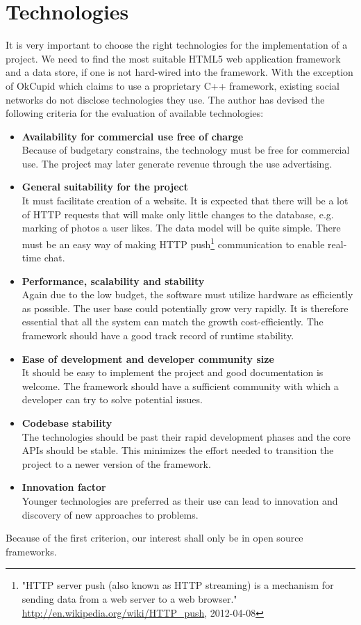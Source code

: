 \documentclass[12pt,oneside]{fithesis}
\begin{document}
\section{Technologies}
	It is very important to choose the right technologies for the implementation of a project. We need to find the most suitable HTML5 web application framework and a data store, if one is not hard-wired into the framework. With the exception of OkCupid which claims to use a proprietary C++ framework, existing social networks do not disclose technologies they use. The author has devised the following criteria for the evaluation of available technologies:
	\begin{itemize}
		\item \textbf{Availability for commercial use free of charge}\\
			Because of budgetary constrains, the technology must be free for commercial use. The project may later generate revenue through the use advertising.
		\item \textbf{General suitability for the project}\\
			It must facilitate creation of a website. It is expected that there will be a lot of HTTP requests that will make only little changes to the database, e.g. marking of photos a user likes. The data model will be quite simple. There must be an easy way of making HTTP push\footnote{"HTTP server push (also known as HTTP streaming) is a mechanism for sending data from a web server to a web browser." \url{http://en.wikipedia.org/wiki/HTTP_push}, {2012-04-08}} communication to enable real-time chat. 
		\item \textbf{Performance, scalability and stability}\\
			Again due to the low budget, the software must utilize hardware as efficiently as possible. The user base could potentially grow very rapidly. It is therefore essential that all the system can match the growth cost-efficiently. The framework should have a good track record of runtime stability.
		\item \textbf{Ease of development and developer community size}\\
			It should be easy to implement the project and good documentation is welcome. The framework should have a sufficient community with which a developer can try to solve potential issues.
		\item \textbf{Codebase stability}\\
			The technologies should be past their rapid development phases and the core APIs should be stable. This minimizes the effort needed to transition the project to a newer version of the framework. 
		\item \textbf{Innovation factor}\\
			Younger technologies are preferred as their use can lead to innovation and discovery of new approaches to problems.
	\end{itemize}
	Because of the first criterion, our interest shall only be in open source frameworks.
\end{document}
